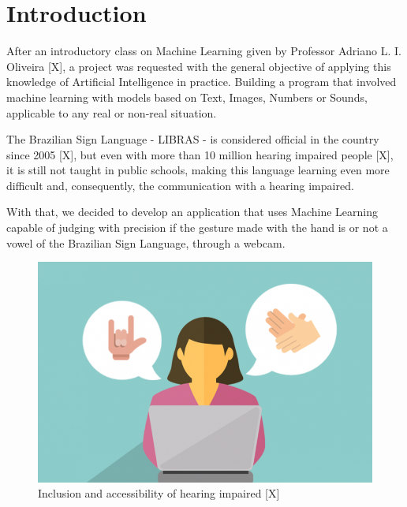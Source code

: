 \documentclass[a4paper, 12pt]{article}
\begin{document}
\newpage
\tableofcontents
\thispagestyle{empty}

\newpage
{}

\section{Introduction}

After an introductory class on Machine Learning given by Professor Adriano L. I. Oliveira [X], a project was requested with the general objective of applying this knowledge of Artificial Intelligence in practice. Building a program that involved machine learning with models based on Text, Images, Numbers or Sounds, applicable to any real or non-real situation.

The Brazilian Sign Language - LIBRAS - is considered official in the country since 2005 [X], but even with more than 10 million hearing impaired people [X], it is still not taught in public schools, making this language learning even more difficult and, consequently, the communication with a hearing impaired.

With that, we decided to develop an application that uses Machine Learning capable of judging with precision if the gesture made with the hand is or not a vowel of the Brazilian Sign Language, through a webcam.

\begin{figure}[!ht]
\centering
\includegraphics[scale=0.2]{gestures.png}
\caption{Inclusion and accessibility of hearing impaired [X]}
\label{figure_1}
\end{figure}
\end{document}
